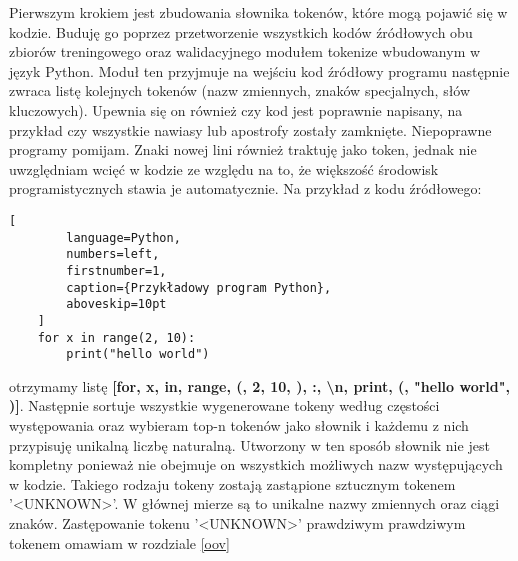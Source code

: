 Pierwszym krokiem jest zbudowania słownika tokenów, które mogą pojawić się w kodzie. Buduję go poprzez przetworzenie wszystkich kodów źródłowych obu zbiorów treningowego oraz 
walidacyjnego modułem tokenize \cite{tokenize} wbudowanym w język Python. Moduł ten przyjmuje na wejściu kod źródłowy programu następnie zwraca listę kolejnych tokenów (nazw zmiennych, 
znaków specjalnych, słów kluczowych). Upewnia się on również czy kod jest poprawnie napisany, na przykład czy wszystkie nawiasy lub apostrofy zostały zamknięte. Niepoprawne programy pomijam. 
Znaki nowej lini również traktuję jako token, jednak nie uwzględniam wcięć w kodzie ze względu na to, że większość środowisk programistycznych stawia je 
automatycznie. Na przykład z kodu źródłowego: 
\begin{addmargin}[10mm]{0mm}
    \begin{lstlisting}[
        language=Python,
        numbers=left,
        firstnumber=1,
        caption={Przykładowy program Python},
        aboveskip=10pt
    ]
    for x in range(2, 10): 
        print("hello world")
    \end{lstlisting}
    \end{addmargin}
otrzymamy listę \textbf{ [for, x, in, range, (, 2, 10, ), :, \textbackslash n, print, (, "hello world", )]}.
Następnie sortuje wszystkie wygenerowane tokeny według częstości występowania oraz wybieram top-n tokenów jako słownik i każdemu z nich przypisuję unikalną liczbę naturalną. 
Utworzony w ten sposób słownik nie jest kompletny ponieważ nie obejmuje on wszystkich możliwych nazw występujących w kodzie. Takiego rodzaju tokeny
zostają zastąpione sztucznym tokenem '<UNKNOWN>'. W głównej mierze są to unikalne nazwy zmiennych oraz ciągi znaków. Zastępowanie tokenu '<UNKNOWN>' prawdziwym prawdziwym tokenem omawiam w 
rozdziale \ref{oov}


